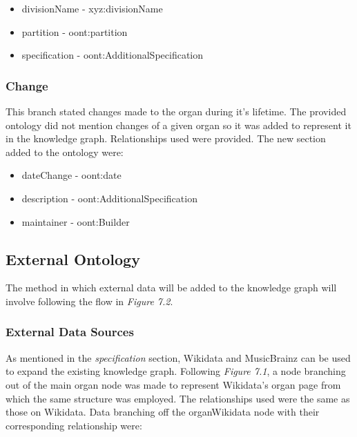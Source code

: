 \vspace{-0.1cm}
\begin{itemize}
    \itemsep0em 
    \item divisionName - xyz:divisionName
    \vspace{-0.05cm}
    \item partition - oont:partition
    \vspace{-0.05cm}
    \item specification - oont:AdditionalSpecification
\end{itemize}

\subsubsection{Change}
\hspace*{0.5cm} This branch stated changes made to the organ during it's lifetime. The provided ontology did not mention changes of a given organ so it was added to represent it in the knowledge graph. Relationships used were provided. The new section added to the ontology were:

\vspace{-0.1cm}
\begin{itemize}
    \itemsep0em 
    \vspace{-0.15cm}
    \item dateChange - oont:date 
    \vspace{-0.05cm}
    \item description - oont:AdditionalSpecification
    \vspace{-0.05cm}
    \item maintainer - oont:Builder
    \vspace{-0.1cm}
\end{itemize}

\subsection{External Ontology}
\hspace*{0.5cm} The method in which external data will be added to the knowledge graph will involve following the flow in \textit{Figure 7.2}.

\subsubsection{External Data Sources}
\hspace*{0.5cm} As mentioned in the \textit{specification} section, Wikidata and MusicBrainz can be used to expand the existing knowledge graph. Following \textit{Figure 7.1}, a node branching out of the main organ node was made to represent Wikidata's organ page \cite{organwikidata} from which the same structure was employed. The relationships used were the same as those on Wikidata. Data branching off the organWikidata node with their corresponding relationship were:

